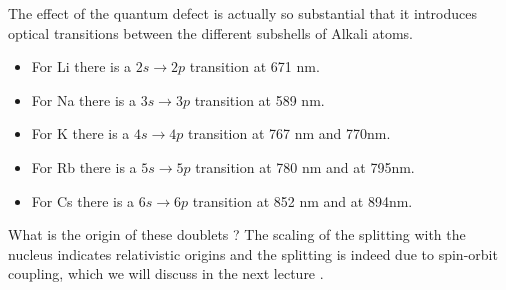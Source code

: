 \documentclass[10pt]{article}
\let\cite\citep
\providecommand\citep{\cite}
\begin{document}
The effect of the quantum defect is actually so substantial that it introduces optical transitions between the different subshells of Alkali atoms.
\begin{itemize}
\item For Li there is a $2s\rightarrow 2p$ transition at 671 nm.
\item For Na there is a $3s\rightarrow 3p$ transition at 589 nm.
\item For K there is a $4s\rightarrow 4p$ transition at 767 nm and 770nm.
\item For Rb there is a $5s\rightarrow 5p$ transition at 780 nm and at 795nm.
\item For Cs there is a $6s\rightarrow 6p$ transition at 852 nm and at 894nm.
\end{itemize}

What is the origin of these doublets ? The scaling of the splitting with the nucleus indicates relativistic origins and the splitting is indeed due to spin-orbit coupling, which we will discuss in the next lecture \cite{systems}.

\FloatBarrier


\end{document}
